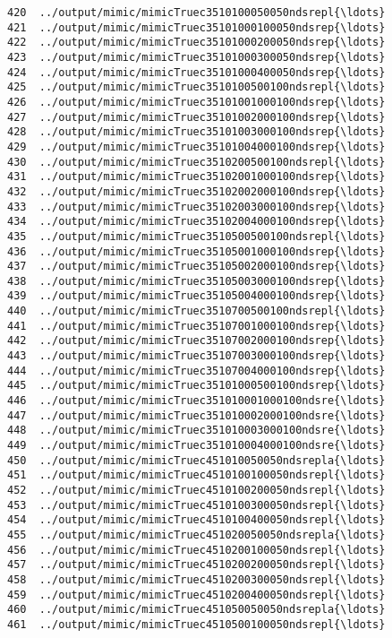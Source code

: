 \documentclass[11pt]{article}
\begin{document}
\begin{Verbatim}[commandchars=\\\{\}]
420  ../output/mimic/mimicTruec3510100050050ndsrepl{\ldots}  
421  ../output/mimic/mimicTruec35101000100050ndsrep{\ldots}  
422  ../output/mimic/mimicTruec35101000200050ndsrep{\ldots}  
423  ../output/mimic/mimicTruec35101000300050ndsrep{\ldots}  
424  ../output/mimic/mimicTruec35101000400050ndsrep{\ldots}  
425  ../output/mimic/mimicTruec3510100500100ndsrepl{\ldots}  
426  ../output/mimic/mimicTruec35101001000100ndsrep{\ldots}  
427  ../output/mimic/mimicTruec35101002000100ndsrep{\ldots}  
428  ../output/mimic/mimicTruec35101003000100ndsrep{\ldots}  
429  ../output/mimic/mimicTruec35101004000100ndsrep{\ldots}  
430  ../output/mimic/mimicTruec3510200500100ndsrepl{\ldots}  
431  ../output/mimic/mimicTruec35102001000100ndsrep{\ldots}  
432  ../output/mimic/mimicTruec35102002000100ndsrep{\ldots}  
433  ../output/mimic/mimicTruec35102003000100ndsrep{\ldots}  
434  ../output/mimic/mimicTruec35102004000100ndsrep{\ldots}  
435  ../output/mimic/mimicTruec3510500500100ndsrepl{\ldots}  
436  ../output/mimic/mimicTruec35105001000100ndsrep{\ldots}  
437  ../output/mimic/mimicTruec35105002000100ndsrep{\ldots}  
438  ../output/mimic/mimicTruec35105003000100ndsrep{\ldots}  
439  ../output/mimic/mimicTruec35105004000100ndsrep{\ldots}  
440  ../output/mimic/mimicTruec3510700500100ndsrepl{\ldots}  
441  ../output/mimic/mimicTruec35107001000100ndsrep{\ldots}  
442  ../output/mimic/mimicTruec35107002000100ndsrep{\ldots}  
443  ../output/mimic/mimicTruec35107003000100ndsrep{\ldots}  
444  ../output/mimic/mimicTruec35107004000100ndsrep{\ldots}  
445  ../output/mimic/mimicTruec35101000500100ndsrep{\ldots}  
446  ../output/mimic/mimicTruec351010001000100ndsre{\ldots}  
447  ../output/mimic/mimicTruec351010002000100ndsre{\ldots}  
448  ../output/mimic/mimicTruec351010003000100ndsre{\ldots}  
449  ../output/mimic/mimicTruec351010004000100ndsre{\ldots}  
450  ../output/mimic/mimicTruec451010050050ndsrepla{\ldots}  
451  ../output/mimic/mimicTruec4510100100050ndsrepl{\ldots}  
452  ../output/mimic/mimicTruec4510100200050ndsrepl{\ldots}  
453  ../output/mimic/mimicTruec4510100300050ndsrepl{\ldots}  
454  ../output/mimic/mimicTruec4510100400050ndsrepl{\ldots}  
455  ../output/mimic/mimicTruec451020050050ndsrepla{\ldots}  
456  ../output/mimic/mimicTruec4510200100050ndsrepl{\ldots}  
457  ../output/mimic/mimicTruec4510200200050ndsrepl{\ldots}  
458  ../output/mimic/mimicTruec4510200300050ndsrepl{\ldots}  
459  ../output/mimic/mimicTruec4510200400050ndsrepl{\ldots}  
460  ../output/mimic/mimicTruec451050050050ndsrepla{\ldots}  
461  ../output/mimic/mimicTruec4510500100050ndsrepl{\ldots}  

\end{Verbatim}
\end{document}
